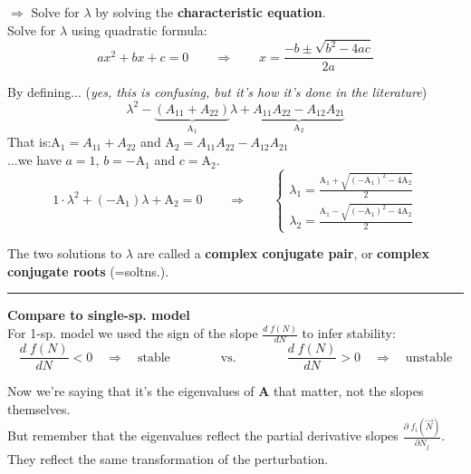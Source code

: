 \documentclass{article}
\newcommand{\ind}{\-\hspace{1cm}}
\begin{document}
\ind $\Rightarrow$ Solve for $\lambda$ by solving the \textbf{characteristic equation}.\\

Solve for $\lambda$ using quadratic formula:
\begin{equation*}
	a x^2 + bx + c = 0 \qquad  \Rightarrow  \qquad x = \frac{-b\pm \sqrt{b^2 - 4ac}}{2a}
\end{equation*}

By defining... \ind (\emph{yes, this is confusing, but it's how it's done in the literature})\\
\begin{equation*}
	\lambda^2 - \underbrace{(A_{11}+A_{22})}_{\text{A}_1}\lambda + \underbrace{A_{11}A_{22} - A_{12} A_{21}}_{\text{A}_2}
\end{equation*}
That is:\ind $\text{A}_1 = A_{11}+A_{22}$ and $\text{A}_2 = A_{11} A_{22} - A_{12} A_{21}$\\

...we have $a=1$, $b=-\text{A}_1$ and $c=\text{A}_2$.
\begin{equation*}
	1 \cdot \lambda^2 + (-\text{A}_1)\lambda + \text{A}_2 = 0 \qquad  \Rightarrow  \qquad  
	 \begin{cases} 
	\lambda_1 = \frac{\text{A}_1 + \sqrt{(-\text{A}_1)^2 - 4\text{A}_2}}{2} \\
	\lambda_2 = \frac{\text{A}_1 - \sqrt{(-\text{A}_1)^2 - 4\text{A}_2}}{2}
	\end{cases}
\end{equation*}

The two solutions to $\lambda$ are called a \textbf{complex conjugate pair}, or  \textbf{complex conjugate roots} (=soltns.).

\rule[0.5ex]{\linewidth}{1pt}
 
\textbf{Compare to single-sp. model}\\
For 1-sp. model we used the sign of the slope $\frac{d \; f(N)}{dN}$ to infer stability:
\begin{equation*}
	\frac{d \; f(N)}{dN} < 0 \quad \Rightarrow \quad \text{stable} \qquad \qquad \text{vs.}\qquad \qquad
	\frac{d \; f(N)}{dN} > 0 \quad \Rightarrow \quad \text{unstable}
\end{equation*}

Now we're saying that it's the eigenvalues of $\mathbf{A}$ that matter, not the slopes themselves.\\
But remember that the eigenvalues reflect the partial derivative slopes $\frac{\partial \; f_i(\vec{N})}{\partial N_j}$. \\
\ind They reflect the same transformation of the perturbation.\\
\end{document}

